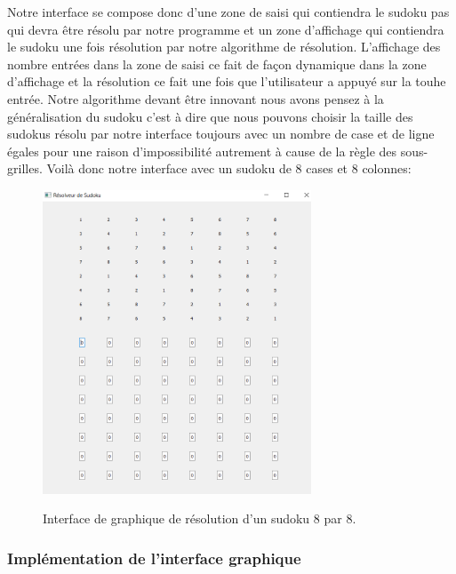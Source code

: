 Notre interface se compose donc d'une zone de saisi qui contiendra le sudoku pas qui devra être résolu par notre programme et un zone d'affichage qui contiendra le sudoku une fois résolution par notre algorithme de résolution. L'affichage des nombre entrées dans la zone de saisi ce fait de façon dynamique dans la zone d'affichage et la résolution ce fait une fois que l'utilisateur a appuyé sur la touhe entrée. Notre algorithme devant être innovant nous avons pensez à la généralisation du sudoku c'est à dire que nous pouvons choisir la taille des sudokus résolu par notre interface toujours avec un nombre de case et de ligne égales pour une raison d'impossibilité autrement à cause de la règle des sous-grilles.\newline
Voilà donc notre interface avec un sudoku de 8 cases et 8 colonnes:\newline

\begin{figure}[h]
  \begin{center}
\includegraphics[width=8cm]{./images/8_8.png}\label{Interface_affichage_8_8}
\caption{Interface de graphique de résolution d'un sudoku 8 par 8.}
\end{center}
\end{figure}


\subsubsection{Implémentation de l'interface graphique}


